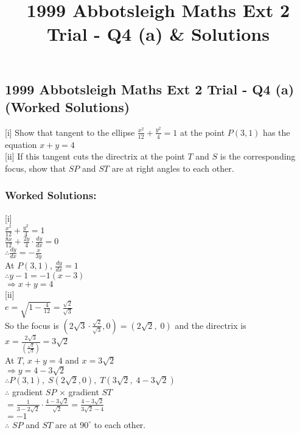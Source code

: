 \documentclass[10pt,a4paper]{report}
\title{1999 Abbotsleigh Maths Ext 2 Trial - Q4 (a) & Solutions}
\theoremstyle{thm}
\begin{document}
\subsection*{1999 Abbotsleigh Maths Ext 2 Trial - Q4 (a) (Worked Solutions)}
[i] Show that tangent to the ellipse $\displaystyle\frac{{{x^2}}}{{12}} + 
\frac{{{y^2}}}{4} = 1$ at the point $P\left( {3,1} \right)$ has the equation $x 
+ y = 4$\\[1em]
[ii] If this tangent cuts the directrix at the point $T$ and $S$ is the 
corresponding focus, show that $SP$ and $ST$ are at right angles to each 
other.\\
\subsubsection{Worked Solutions:}
[i]\\
$\displaystyle \frac{x^2}{12} + \frac{y^2}{4} = 1$\\
$\displaystyle \frac{8x}{12} + \frac{2y}{4} \cdot \frac{dy}{dx} = 0$\\
$\therefore \displaystyle \frac{dy}{dx} =  - \frac{x}{3y}$\\[1em]
At $P\left(3,1\right)$, $\displaystyle \frac{dy}{dx} =  1$\\
$\therefore y - 1 =  - 1\left(x - 3\right)$\\
$ \Rightarrow x + y = 4$\\[1em]
[ii]\\
$e = \sqrt {1 - \displaystyle\frac{4}{12}}  = \frac{\sqrt 2 }{\sqrt 3 }$\\
So the focus is $\left(2\sqrt 3  \cdot \displaystyle\frac{\sqrt 2 }{\sqrt 3 },0 \right) = \left(2\sqrt 2 ,\;0 \right)$ and the directrix is $x = \frac{2\sqrt 3 }{\left( \displaystyle\frac{\sqrt 2 }{\sqrt 3 } \right)} = 3\sqrt 2 $\\[1em]
At $T$, $x + y = 4$ and $x = 3\sqrt 2 $\\
$ \Rightarrow y = 4 - 3\sqrt 2 $\\
$\therefore P\left( {3,1} \right),\;S\left(2\sqrt 2 ,0 \right),\;T\left(3\sqrt 2 ,\;4 - 3\sqrt 2 \right)$\\[1em]
$\therefore $ gradient $SP$ $ \times $ gradient $ST$\\
$ = \displaystyle\frac{1}{3 - 2\sqrt 2 } \cdot \frac{4 - 3\sqrt 2 }{\sqrt 2 } = \frac{4 - 3\sqrt 2 }{3\sqrt 2  - 4}$\\
$ =  - 1$\\[1em]
$\therefore $ $SP$ and $ST$ are at $90^\circ $ to each other.\\
\end{document}
